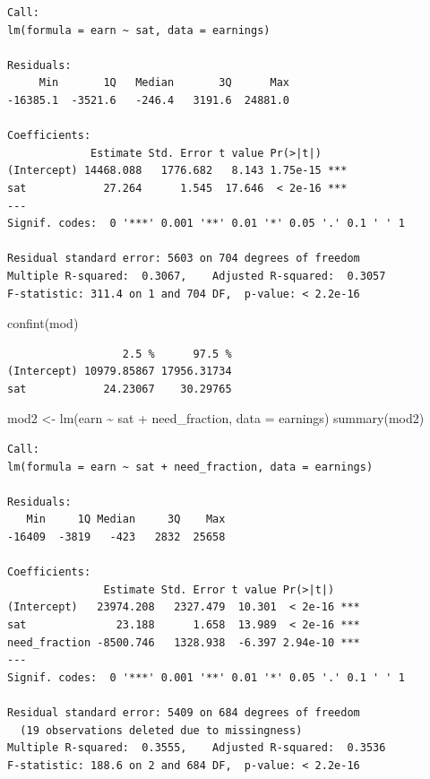 \documentclass[
]{article}
\newenvironment{Shaded}{\begin{snugshade}}{\end{snugshade}}
\newcommand{\AttributeTok}[1]{\textcolor[rgb]{0.77,0.63,0.00}{#1}}
\newcommand{\FunctionTok}[1]{\textcolor[rgb]{0.00,0.00,0.00}{#1}}
\newcommand{\NormalTok}[1]{#1}
\newcommand{\OtherTok}[1]{\textcolor[rgb]{0.56,0.35,0.01}{#1}}
\newcommand{\SpecialCharTok}[1]{\textcolor[rgb]{0.00,0.00,0.00}{#1}}
\begin{document}
\begin{verbatim}
Call:
lm(formula = earn ~ sat, data = earnings)

Residuals:
     Min       1Q   Median       3Q      Max 
-16385.1  -3521.6   -246.4   3191.6  24881.0 

Coefficients:
             Estimate Std. Error t value Pr(>|t|)    
(Intercept) 14468.088   1776.682   8.143 1.75e-15 ***
sat            27.264      1.545  17.646  < 2e-16 ***
---
Signif. codes:  0 '***' 0.001 '**' 0.01 '*' 0.05 '.' 0.1 ' ' 1

Residual standard error: 5603 on 704 degrees of freedom
Multiple R-squared:  0.3067,    Adjusted R-squared:  0.3057 
F-statistic: 311.4 on 1 and 704 DF,  p-value: < 2.2e-16
\end{verbatim}

\begin{Shaded}
\begin{Highlighting}[]
\FunctionTok{confint}\NormalTok{(mod)}
\end{Highlighting}
\end{Shaded}

\begin{verbatim}
                  2.5 %      97.5 %
(Intercept) 10979.85867 17956.31734
sat            24.23067    30.29765
\end{verbatim}

\begin{Shaded}
\begin{Highlighting}[]
\NormalTok{mod2 }\OtherTok{\textless{}{-}} \FunctionTok{lm}\NormalTok{(earn }\SpecialCharTok{\textasciitilde{}}\NormalTok{ sat }\SpecialCharTok{+}\NormalTok{ need\_fraction, }\AttributeTok{data =}\NormalTok{ earnings)}
\FunctionTok{summary}\NormalTok{(mod2)}
\end{Highlighting}
\end{Shaded}

\begin{verbatim}
Call:
lm(formula = earn ~ sat + need_fraction, data = earnings)

Residuals:
   Min     1Q Median     3Q    Max 
-16409  -3819   -423   2832  25658 

Coefficients:
               Estimate Std. Error t value Pr(>|t|)    
(Intercept)   23974.208   2327.479  10.301  < 2e-16 ***
sat              23.188      1.658  13.989  < 2e-16 ***
need_fraction -8500.746   1328.938  -6.397 2.94e-10 ***
---
Signif. codes:  0 '***' 0.001 '**' 0.01 '*' 0.05 '.' 0.1 ' ' 1

Residual standard error: 5409 on 684 degrees of freedom
  (19 observations deleted due to missingness)
Multiple R-squared:  0.3555,    Adjusted R-squared:  0.3536 
F-statistic: 188.6 on 2 and 684 DF,  p-value: < 2.2e-16
\end{verbatim}
\end{document}
